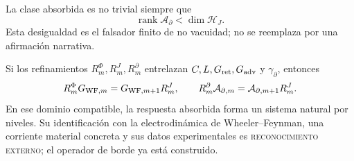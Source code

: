La clase absorbida es no trivial siempre que
\[
 \operatorname{rank}\mathcal A_\partial<\dim\mathcal H_J.
\]
Esta desigualdad es el falsador finito de no vacuidad; no se reemplaza por
una afirmación narrativa.

Si los refinamientos \(R_m^\Phi,R_m^J,R_m^\partial\) entrelazan
\(C,L,G_{\rm ret},G_{\rm adv}\) y \(\gamma_\partial\), entonces
\[
 R_m^\Phi G_{{\rm WF},m}
 =G_{{\rm WF},m+1}R_m^J,\qquad
 R_m^\partial\mathcal A_{\partial,m}
 =\mathcal A_{\partial,m+1}R_m^J.
\]
En ese dominio compatible, la respuesta absorbida forma un sistema natural
por niveles. Su identificación con la electrodinámica de
Wheeler--Feynman, una corriente material concreta y sus datos experimentales
es \textsc{reconocimiento externo}; el operador de borde ya está construido.


